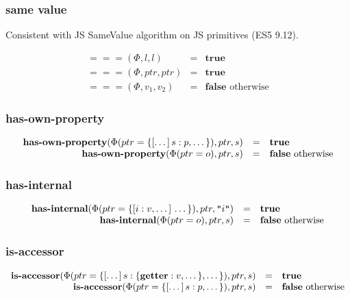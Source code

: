 \documentclass[draft, 10pt]{article}
\newcommand{\lit}[0]{l}
\newcommand{\str}[0]{s}
\newcommand{\id}[0]{i}
\newcommand{\true}[0]{\textbf{true}}
\newcommand{\false}[0]{\textbf{false}}
\newcommand{\paget}[0]{\textbf{getter}}
\newcommand{\ophasprop}[0]{\textbf{has-own-property}}
\newcommand{\opisaccessor}[0]{\textbf{is-accessor}}
\newcommand{\opsamevalue}[0]{===}
\newcommand{\ophasinternal}[0]{\textbf{has-internal}}
\newcommand{\heap}[0]{\Phi}
\newcommand{\mapadd}[3]{#1(#2 = #3)}
\newcommand{\bigval}[0]{v}
\newcommand{\oprop}[0]{p}
\newcommand{\obj}[0]{o}
\newcommand{\objlit}[2]{\{[#1]\thinspace#2\}}
\newcommand{\heapptr}{ptr}
\newcommand{\runbinop}[4]{#1(#2,#3,#4)}
\begin{document}
\subsubsection{same value}

Consistent with JS SameValue algorithm on JS primitives (ES5 9.12).

\[
\begin{array}{rcl}
\runbinop{\opsamevalue}{\heap}{\lit}{\lit} &=& \true \\
\runbinop{\opsamevalue}{\heap}{\heapptr}{\heapptr} &=& \true \\
\runbinop{\opsamevalue}{\heap}{\bigval_1}{\bigval_2} &=& \false \textrm{ otherwise} 
\end{array}
\]

\subsubsection{has-own-property}

\[
\begin{array}{rcl}
\runbinop{\ophasprop}{\mapadd{\heap}{\heapptr}{\objlit{\dots}{\str : \oprop, \dots}}}{\heapptr}{\str} &=& \true \\
\runbinop{\ophasprop}{\mapadd{\heap}{\heapptr}{\obj}}{\heapptr}{\str} &=& \false \textrm{ otherwise}
\end{array}
\]

\subsubsection{has-internal}

\[
\begin{array}{rcl}
\runbinop{\ophasinternal}{\mapadd{\heap}{\heapptr}{\objlit{\id : \bigval, \dots}{\dots}}}{\heapptr}{\texttt{"}\id\texttt{"}} &=& \true \\
\runbinop{\ophasinternal}{\mapadd{\heap}{\heapptr}{\obj}}{\heapptr}{\str} &=& \false \textrm{ otherwise}
\end{array}
\]

\subsubsection{is-accessor}

\[
\begin{array}{rcl}
\runbinop{\opisaccessor}{\mapadd{\heap}{\heapptr}{\objlit{\dots}{\str : \{\paget : \bigval, \dots\}, \dots}}}{\heapptr}{\str} &=& \true \\
\runbinop{\opisaccessor}{\mapadd{\heap}{\heapptr}{\objlit{\dots}{\str : \oprop, \dots}}}{\heapptr}{\str} &=& \false \textrm{ otherwise} 
\end{array}
\]
\end{document}
